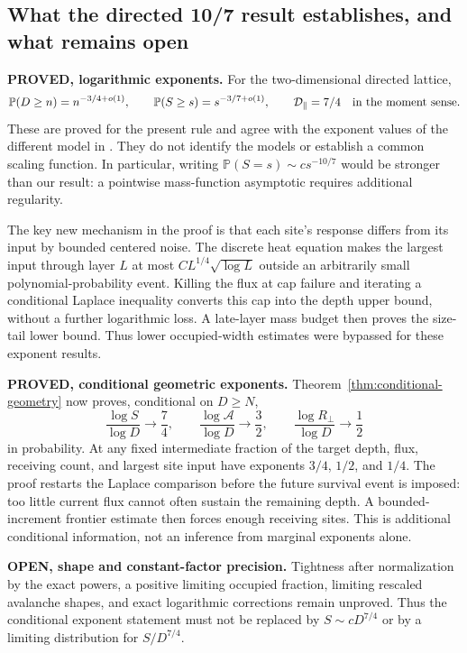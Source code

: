 \documentclass[11pt]{article}
\numberwithin{equation}{section}
\theoremstyle{definition}
\newcommand{\Prob}{\mathbb P}
\newcommand{\status}[1]{\textsf{\textbf{#1}}}
\begin{document}
\subsection{What the directed 10/7 result establishes, and what remains open}
\status{PROVED, logarithmic exponents.} For the two-dimensional directed lattice,
\begin{equation}\label{eq:directed-prediction}
 \Prob(D\ge n)=n^{-3/4+o(1)},\qquad
 \Prob(S\ge s)=s^{-3/7+o(1)},\qquad
 \mathcal D_\parallel=7/4\quad\hbox{in the moment sense}.
\end{equation}
These are proved for the present rule and agree with the exponent values of the different model in \cite{KMT}. They do not identify the models or establish a common scaling function. In particular, writing $\Prob(S=s)\sim c s^{-10/7}$ would be stronger than our result: a pointwise mass-function asymptotic requires additional regularity.

The key new mechanism in the proof is that each site's response differs from its input by bounded centered noise. The discrete heat equation makes the largest input through layer $L$ at most $C L^{1/4}\sqrt{\log L}$ outside an arbitrarily small polynomial-probability event. Killing the flux at cap failure and iterating a conditional Laplace inequality converts this cap into the depth upper bound, without a further logarithmic loss. A late-layer mass budget then proves the size-tail lower bound. Thus lower occupied-width estimates were bypassed for these exponent results.

\status{PROVED, conditional geometric exponents.} Theorem~\ref{thm:conditional-geometry} now proves, conditional on $D\ge N$,
\[
 \frac{\log S}{\log D}\to\frac74,\qquad
 \frac{\log\mathcal A}{\log D}\to\frac32,\qquad
 \frac{\log R_\perp}{\log D}\to\frac12
\]
in probability. At any fixed intermediate fraction of the target depth, flux, receiving count, and largest site input have exponents $3/4$, $1/2$, and $1/4$. The proof restarts the Laplace comparison before the future survival event is imposed: too little current flux cannot often sustain the remaining depth. A bounded-increment frontier estimate then forces enough receiving sites. This is additional conditional information, not an inference from marginal exponents alone.

\status{OPEN, shape and constant-factor precision.} Tightness after normalization by the exact powers, a positive limiting occupied fraction, limiting rescaled avalanche shapes, and exact logarithmic corrections remain unproved. Thus the conditional exponent statement must not be replaced by $S\sim cD^{7/4}$ or by a limiting distribution for $S/D^{7/4}$.
\end{document}
